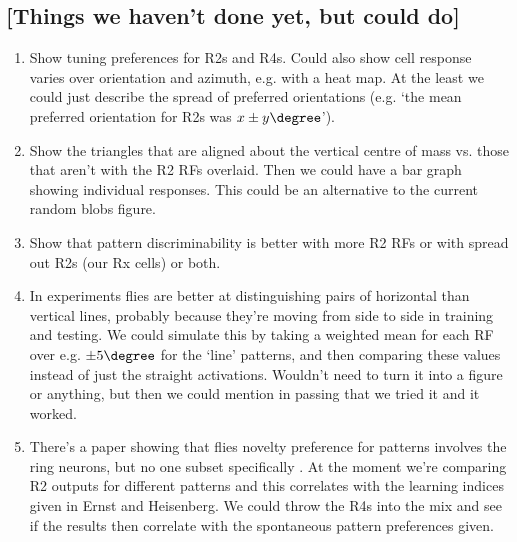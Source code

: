 \subsection{[Things we haven't done yet, but could do]}
\begin{enumerate}
 \item Show tuning preferences for R2s and R4s. Could also show cell response varies over orientation and azimuth, e.g. with a heat map. At the least we could just describe the spread of preferred orientations (e.g. `the mean preferred orientation for R2s was $x\pm y\degree$').
 \item Show the triangles that are aligned about the vertical centre of mass vs. those that aren't with the R2 RFs overlaid. Then we could have a bar graph showing individual responses. This could be an alternative to the current random blobs figure.
 \item Show that pattern discriminability is better with more R2 RFs or with spread out R2s (our Rx cells) or both.
 \item In experiments flies are better at distinguishing pairs of horizontal than vertical lines, probably because they're moving from side to side in training and testing. We could simulate this by taking a weighted mean for each RF over e.g. $\pm 5\degree$ for the `line' patterns, and then comparing these values instead of just the straight activations. Wouldn't need to turn it into a figure or anything, but then we could mention in passing that we tried it and it worked.
 \item There's a paper showing that flies novelty preference for patterns involves the ring neurons, but no one subset specifically \cite{Solanki2015}. At the moment we're comparing R2 outputs for different patterns and this correlates with the learning indices given in Ernst and Heisenberg. We could throw the R4s into the mix and see if the results then correlate with the spontaneous pattern preferences given.
\end{enumerate}